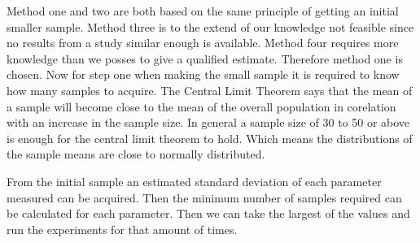 Method one and two are both based on the same principle of getting an initial smaller sample. Method three is to the extend of our knowledge not feasible since no results from a study similar enough is available. Method four requires more knowledge than we posses to give a qualified estimate. Therefore method one is chosen. Now for step one when making the small sample it is required to know how many samples to acquire. The Central Limit Theorem says that the mean of a sample will become close to the mean of the overall population in corelation with an increase in the sample size. In general a sample size of 30 to 50 or above is enough for the central limit theorem to hold. Which means the distributions of the sample means are close to normally distributed.


From the initial sample an estimated standard deviation of each parameter measured can be acquired. Then the minimum number of samples required can be calculated for each parameter. Then we can take the largest of the values and run the experiments for that amount of times.




